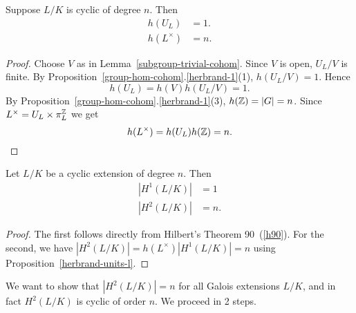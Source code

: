 \begin{pr}
Suppose $L/K$ is cyclic of degree $n$. Then
\begin{align*}
h(U_L)&=1.\\
h(L^{\times})&=n.
\end{align*}
\end{pr}
\begin{proof}
Choose $V$ as in Lemma~\ref{subgroup-trivial-cohom}. Since $V$ is open, $U_L/V$ is finite. By Proposition~\ref{group-hom-cohom}.\ref{herbrand-1}(1), $h(U_L/V)=1$. Hence
\[
h(U_L)=h(V)h(U_L/V)=1.
\]
By Proposition~\ref{group-hom-cohom}.\ref{herbrand-1}(3), $h(\mathbb{Z})=|G|=n$. 
Since $L^{\times}=U_L\times \pi_L^{\mathbb{Z}}$ we get %
\[
h(L^{\times})=h(U_L)h(\mathbb{Z})=n.
\]
\end{proof}
\begin{thm}
Let $L/K$ be a cyclic extension of degree $n$. Then
\begin{align*}
|H^1(L/K)|&=1\\
|H^2(L/K)|&=n.
\end{align*}
\end{thm}
\begin{proof}
The first follows directly from Hilbert's Theorem 90~(\ref{h90}). For the second, we have $|H^2(L/K)|=h(L^{\times})|H^1(L/K)|=n$ using Proposition~\ref{herbrand-units-l}.
\end{proof}
We want to show that $|H^2(L/K)|=n$ for all Galois extensions $L/K$, and in fact $H^2(L/K)$ is cyclic of order $n$. We proceed in 2 steps.
